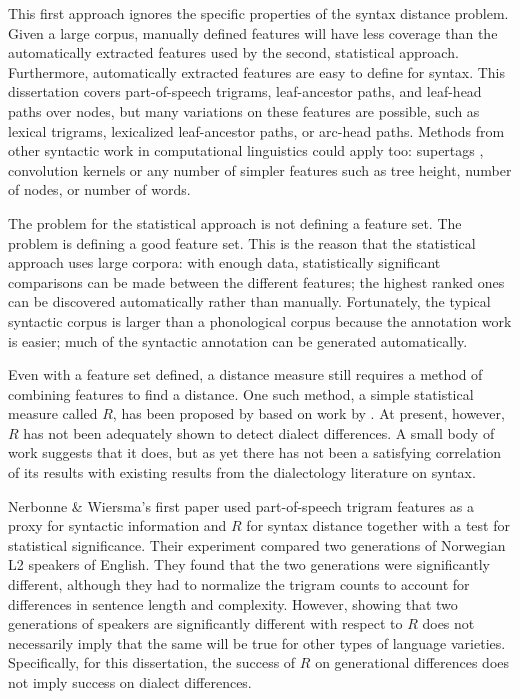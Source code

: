 This first approach ignores the specific properties of the syntax
distance problem. Given a large corpus, manually defined features will
have less coverage than the automatically extracted features used by
the second, statistical approach. Furthermore, automatically extracted
features are easy to define for syntax.  This dissertation covers
part-of-speech trigrams, leaf-ancestor paths, and leaf-head paths
over nodes, but many variations on these features are possible, such
as lexical trigrams, lexicalized leaf-ancestor paths, or arc-head
paths. Methods from other syntactic work in
computational linguistics could apply too: supertags \cite{joshi94},
convolution kernels \cite{collins01} or any number of simpler features
such as tree height, number of nodes, or number of words.

The problem for the statistical approach is not defining a feature
set. The problem is defining a good feature set. This is the reason
that the statistical approach uses large corpora: with enough data,
statistically significant comparisons can be made between the
different features; the highest ranked ones can be discovered
automatically rather than manually.  Fortunately, the typical syntactic corpus
is larger than a phonological corpus because the annotation
work is easier; much of the syntactic annotation can be generated
automatically.

Even with a feature set defined, a distance measure still requires a
method of combining features to find a distance. One such method, a
simple statistical measure called $R$, has been proposed by
 based on work by . At
present, however, $R$ has not been adequately shown to detect dialect
differences. A small body of work suggests that it does, but as yet
there has not been a satisfying correlation of its results with
existing results from the dialectology literature on syntax.

Nerbonne \& Wiersma's first paper used part-of-speech trigram features
as a proxy for syntactic information and $R$ for syntax distance
together with a test for statistical significance\cite{nerbonne06}.
Their experiment compared two generations of Norwegian L2 speakers of
English.  They found that the two generations were significantly
different, although they had to normalize the trigram counts to
account for differences in sentence length and complexity. However,
showing that two generations of speakers are significantly different
with respect to $R$ does not necessarily imply that the same will be
true for other types of language varieties. Specifically, for this
dissertation, the success of $R$ on generational differences does not
imply success on dialect differences.

